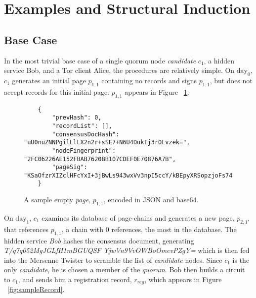 
\section{Examples and Structural Induction}

\subsection{Base Case}

In the most trivial base case of a single quorum node \emph{candidate} $ c_{1} $, a hidden service Bob, and a Tor client Alice, the procedures are relatively simple. On $ \textrm{day}_{0} $, $ c_{1} $ generates an initial page $ p_{1,1} $ containing no records and signs $ p_{1,1} $, but does not accept records for this initial page. $ p_{1,1} $ appears in Figure ~\ref{fig:emptyPage}.

\begin{figure}
	\begin{lstlisting}
	{
		"prevHash": 0,
		"recordList": [],
		"consensusDocHash": "uU0nuZNNPgilLlLX2n2r+sSE7+N6U4DukIj3rOLvzek=",
		"nodeFingerprint": "2FC06226AE152FBAB7620BB107CDEF0E70876A7B",
		"pageSig": "KSaOfzrXIZclHFcYxI+3jBwLs943wxVv3npI5ccY/kBEpyXRSopzjoFs746n0tJqUpdY4Kbe6DBwERaN7ELmSSK9Pu6q8QeKzNAh+QOnKl0fKBN7fqowjkQ3ktFkR0Vuox9WrrbNTMa4+up0Np52hlbKA3zSRz4fbR9NVlh6uuQ="
	}
	\end{lstlisting}
	\caption{A sample empty \emph{page}, $ p_{1,1} $, encoded in JSON and base64.}
	\label{fig:emptyPage}
\end{figure}

On $ \textrm{day}_{1} $, $ c_{1} $ examines its database of page-chains and generates a new page, $ p_{2,1} $, that references $ p_{1,1} $, a chain with 0 references, the most in the database. The hidden service \emph{Bob} hashes the consensus document, generating \emph{T/q7q052MgJGLfH1mBGUQSF YjwVn9VvOWBoOmevPZgY=} which is then fed into the Mersenne Twister to scramble the list of \emph{candidate} nodes. Since $ c_{1} $ is the only \emph{candidate}, he is chosen a member of the \emph{quorum}. Bob then builds a circuit to $ c_{1} $, and sends him a registration record, $ r_{reg} $, which appears in Figure ~\ref{fig:sampleRecord}.

